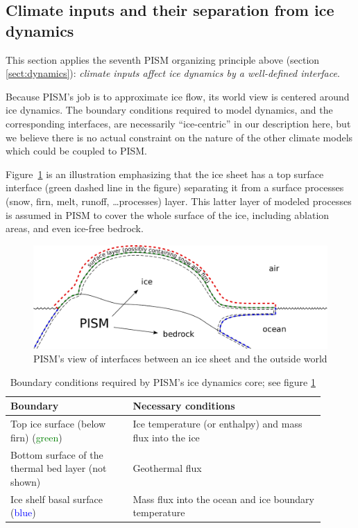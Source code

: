 \documentclass[titlepage,letterpaper,final]{scrartcl}
\begin{document}
\subsection{Climate inputs and their separation from ice dynamics}
\label{sec:climate-inputs}  This section applies the seventh PISM organizing principle above (section \ref{sect:dynamics}): \emph{climate inputs affect ice dynamics by a well-defined interface}.

Because PISM's job is to approximate ice flow, its world view is centered around ice dynamics.  The boundary conditions required to model dynamics, and the corresponding interfaces, are necessarily ``ice-centric'' in our description here, but we believe there is no actual constraint on the nature of the other climate models which could be coupled to PISM.

Figure~\ref{fig:climate-inputs} is an illustration emphasizing that the ice sheet has a top surface interface (green dashed line in the figure) separating it from a surface processes (snow, firn, melt, runoff, \dots processes) layer.  This latter layer of modeled processes is assumed in PISM to cover the whole surface of the ice, including ablation areas, and even ice-free bedrock.

\begin{figure}
  \centering
  \includegraphics[width=5in]{figs/climate-cartoon-new.pdf}
  \caption{PISM's view of interfaces between an ice sheet and the outside world}
  \label{fig:climate-inputs}
\end{figure}

\begin{table}[h]
  \centering
  \begin{tabular}{p{0.35\linewidth}p{0.55\linewidth}}\\
    \hline
    \textbf{Boundary} & \textbf{Necessary conditions}\\
    \hline
    Top ice surface (below firn) (\textcolor{green}{green})& Ice temperature (or enthalpy) and mass flux into the ice\\
    Bottom surface of the thermal bed layer (not shown) & Geothermal flux\\
    Ice shelf basal surface (\textcolor{blue}{blue})& Mass flux into the ocean and ice boundary temperature\\
   \hline
  \end{tabular}
  \caption{Boundary conditions required by PISM's ice dynamics core; see figure
  \ref{fig:climate-inputs}}
  \label{tab:ice-dynamics-bc}
\end{table}
\end{document}
